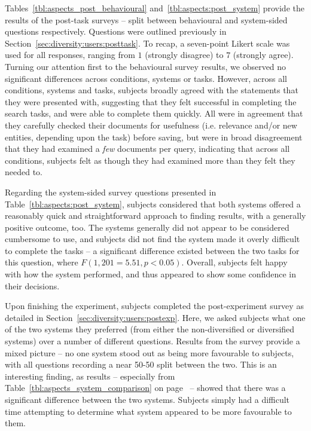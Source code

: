  Tables~\ref{tbl:aspects_post_behavioural} and~\ref{tbl:aspects:post_system} provide the results of the post-task surveys -- split between behavioural and system-sided questions respectively. Questions were outlined previously in Section~\ref{sec:diversity:users:posttask}. To recap, a seven-point Likert scale was used for all responses, ranging from $1$ (strongly disagree) to $7$ (strongly agree). Turning our attention first to the behavioural survey results, we observed no significant differences across conditions, systems or tasks. However, across all conditions, systems and tasks, subjects broadly agreed with the statements that they were presented with, suggesting that they felt successful in completing the search tasks, and were able to complete them quickly. All were in agreement that they carefully checked their documents for usefulness (i.e. relevance and/or new entities, depending upon the task) before saving, but were in broad disagreement that they had examined a \emph{few} documents per query, indicating that across all conditions, subjects felt as though they had examined more than they felt they needed to.

Regarding the system-sided survey questions presented in Table~\ref{tbl:aspects:post_system}, subjects considered that both systems offered a reasonably quick and straightforward approach to finding results, with a generally positive outcome, too. The systems generally did not appear to be considered cumbersome to use, and subjects did not find the system made it overly difficult to complete the tasks -- a significant difference existed between the two tasks for this question, where $F(1, 201=5.51, p<0.05)$. Overall, subjects felt happy with how the system performed, and thus appeared to show some confidence in their decisions.

Upon finishing the experiment, subjects completed the post-experiment survey as detailed in Section~\ref{sec:diversity:users:postexp}. Here, we asked subjects what one of the two systems they preferred (from either the non-diversified or diversified systems) over a number of different questions. Results from the survey provide a mixed picture -- no one system stood out as being more favourable to subjects, with all questions recording a near 50-50 split between the two. This is an interesting finding, as results -- especially from Table~\ref{tbl:aspects_system_comparison} on page~\pageref{tbl:aspects_system_comparison} -- showed that there was a significant difference between the two systems. Subjects simply had a difficult time attempting to determine what system appeared to be more favourable to them.

